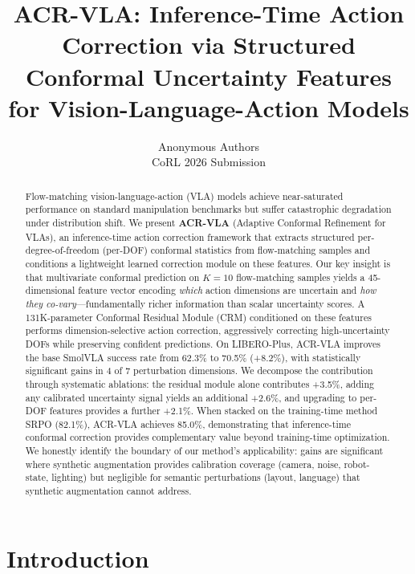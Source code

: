 \documentclass[letterpaper]{article}
\title{ACR-VLA: Inference-Time Action Correction via Structured Conformal Uncertainty Features for Vision-Language-Action Models}
\author{
Anonymous Authors\\
CoRL 2026 Submission
}
\date{}
\begin{document}
\maketitle

\begin{abstract}
Flow-matching vision-language-action (VLA) models achieve near-saturated performance on standard manipulation benchmarks but suffer catastrophic degradation under distribution shift.
We present \textbf{ACR-VLA} (Adaptive Conformal Refinement for VLAs), an inference-time action correction framework that extracts structured per-degree-of-freedom (per-DOF) conformal statistics from flow-matching samples and conditions a lightweight learned correction module on these features.
Our key insight is that multivariate conformal prediction on $K{=}10$ flow-matching samples yields a 45-dimensional feature vector encoding \emph{which} action dimensions are uncertain and \emph{how they co-vary}---fundamentally richer information than scalar uncertainty scores.
A 131K-parameter Conformal Residual Module (CRM) conditioned on these features performs dimension-selective action correction, aggressively correcting high-uncertainty DOFs while preserving confident predictions.
On LIBERO-Plus, ACR-VLA improves the base SmolVLA success rate from 62.3\% to 70.5\% (+8.2\%), with statistically significant gains in 4 of 7 perturbation dimensions.
We decompose the contribution through systematic ablations: the residual module alone contributes +3.5\%, adding any calibrated uncertainty signal yields an additional +2.6\%, and upgrading to per-DOF features provides a further +2.1\%.
When stacked on the training-time method SRPO (82.1\%), ACR-VLA achieves 85.0\%, demonstrating that inference-time conformal correction provides complementary value beyond training-time optimization.
We honestly identify the boundary of our method's applicability: gains are significant where synthetic augmentation provides calibration coverage (camera, noise, robot-state, lighting) but negligible for semantic perturbations (layout, language) that synthetic augmentation cannot address.
\end{abstract}

\section{Introduction}
\label{sec:intro}
\end{document}
